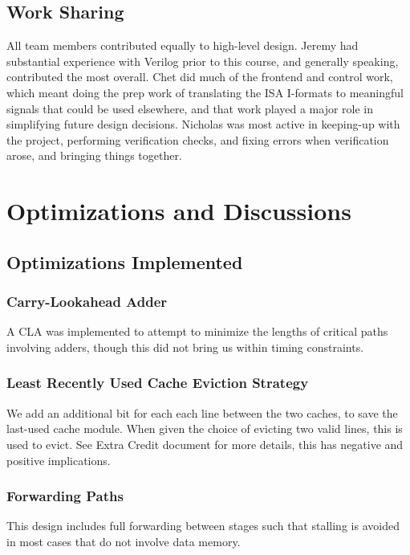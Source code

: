 \documentclass[11pt]{article}
\begin{document}
\subsection{Work Sharing}
\label{sec:org15f546d}
All team members contributed equally to high-level design.  Jeremy
had substantial experience with Verilog prior to this course, and
generally speaking, contributed the most overall. Chet did much of
the frontend and control work, which meant doing the prep work of
translating the ISA I-formats to meaningful signals that could be
used elsewhere, and that work played a major role in simplifying
future design decisions. Nicholas was most active in keeping-up
with the project, performing verification checks, and fixing errors
when verification arose, and bringing things together.

\pagebreak

\section{Optimizations and Discussions}
\label{sec:org25fa29e}

\subsection{Optimizations Implemented}
\label{sec:org16b3eba}
\subsubsection{Carry-Lookahead Adder}
\label{sec:orgec9901c}
A CLA was implemented to attempt to minimize the lengths of
critical paths involving adders, though this did not bring us
within timing constraints.
\subsubsection{Least Recently Used Cache Eviction Strategy}
\label{sec:org5cc7fd0}
We add an additional bit for each each line between the two
caches, to save the last-used cache module. When given the choice
of evicting two valid lines, this is used to evict. See Extra
Credit document for more details, this has negative and positive
implications.

\subsubsection{Forwarding Paths}
\label{sec:orgf450516}
This design includes full forwarding between stages such that
stalling is avoided in most cases that do not involve data memory.
\end{document}
